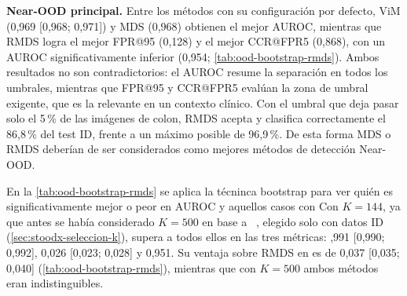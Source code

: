 

\textbf{Near-OOD principal.} Entre los métodos con su configuración por defecto, ViM (0,969 [0,968; 0,971]) y MDS (0,968) obtienen el mejor AUROC, mientras que RMDS logra el mejor FPR@95 (0,128) y el mejor CCR@FPR5 (0,868), con un AUROC significativamente inferior (0,954; \cref{tab:ood-bootstrap-rmds}). 
Ambos resultados no son contradictorios: el AUROC resume la separación en todos los umbrales, mientras que FPR@95 y CCR@FPR5 evalúan la zona de umbral exigente, que es la relevante en un contexto clínico. Con el umbral que deja pasar solo el 5\,\% de las imágenes de colon, RMDS acepta y clasifica correctamente el 86,8\,\% del test ID, frente a un máximo posible de 96,9\,\%. De esta forma MDS o RMDS deberían de ser considerados como 
mejores métodos de detección Near-OOD. 

En la \cref{tab:ood-bootstrap-rmds} se aplica la técninca bootstrap para ver quién es significativamente mejor o peor en AUROC y aquellos casos con 
Con $K = 144$, ya que antes se había considerado $K = 500$ en base a ~\cite{sevillano2026}, elegido solo con datos ID (\cref{sec:stoodx-seleccion-k}), \stoodx supera a todos ellos en las tres métricas: ,991 [0,990; 0,992],  0,026 [0,023; 0,028] y  0,951. Su ventaja sobre RMDS en \AUROC es de 0,037 [0,035; 0,040] (\cref{tab:ood-bootstrap-rmds}), mientras que con $K = 500$ ambos métodos eran indistinguibles.





